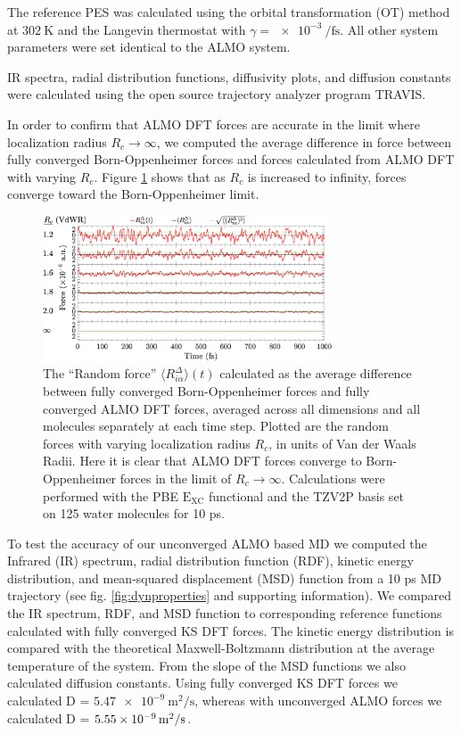 \documentclass[aps,prl,reprint,amsmath,amssymb]{revtex4-1}
\begin{document}
The reference PES was calculated using the orbital transformation (OT) method~\cite{a:ot,a:ot2} at $\SI{302}{\K}$ and the Langevin thermostat with $\gamma = \SI{e-3}{\per\fs}$. 
All other system parameters were set identical to the ALMO system.

IR spectra, radial distribution functions, diffusivity plots, and diffusion constants were calculated using the open source trajectory analyzer program TRAVIS.~\cite{a:travis-main,a:travis-ir1,a:travis-ir2}


In order to confirm that ALMO DFT forces are accurate in the limit where localization radius $R_{c} \rightarrow \infty$, we computed the average difference in force between fully converged Born-Oppenheimer forces and forces calculated from ALMO DFT with varying $R_{c}$. 
Figure \ref{fig:forcecomp} shows that as $R_{c}$ is increased to infinity, forces converge toward the Born-Oppenheimer limit.

\begin{figure}
\includegraphics[trim={0.1cm 0cm 0.2cm 0.1cm},clip,width=8.6cm]{DeltaForceComparison_ALMO_SCF.eps}
\caption{\label{fig:forcecomp}The ``Random force'' $\langle R^{\Delta}_{i\alpha} \rangle (t)$ calculated as the average difference between fully converged Born-Oppenheimer forces and fully converged ALMO DFT forces, averaged across all dimensions and all molecules separately at each time step. 
Plotted are the random forces with varying localization radius $R_{c}$, in units of Van der Waals Radii.
Here it is clear that ALMO DFT forces converge to Born-Oppenheimer forces in the limit of $R_{c} \rightarrow \infty$.
Calculations were performed with the PBE $\mathrm{E_{XC}}$ functional and the TZV2P basis set on 125 water molecules for 10 ps.}
\end{figure}

To test the accuracy of our unconverged ALMO based MD we computed the Infrared (IR) spectrum, radial distribution function (RDF), kinetic energy distribution, and mean-squared displacement (MSD) function from a 10 ps MD trajectory (see fig. \ref{fig:dynproperties} and supporting information). 
We compared the IR spectrum, RDF, and MSD function to corresponding reference functions calculated with fully converged KS DFT forces.
The kinetic energy distribution is compared with the theoretical Maxwell-Boltzmann distribution at the average temperature of the system.
From the slope of the MSD functions we also calculated diffusion constants.
Using fully converged KS DFT forces we calculated D = $\SI{5.47e-9}{\m^{2}\per\s}$, whereas with unconverged ALMO forces we calculated D = $\SI{5.55E-09}{\m^{2}\per\s}$.
\end{document}
